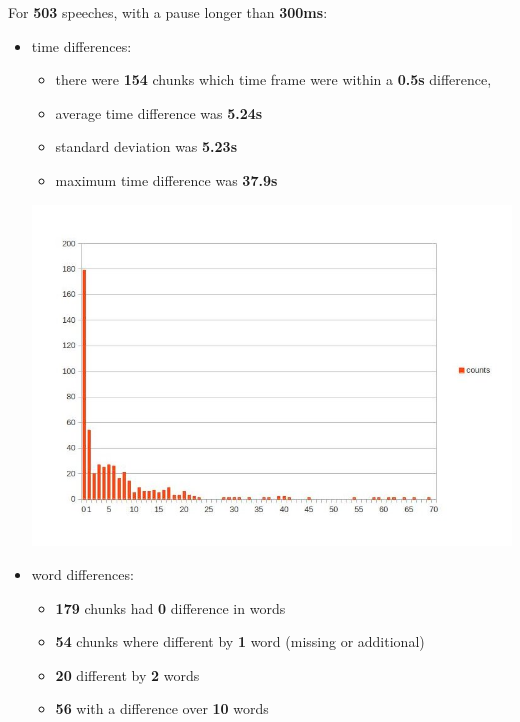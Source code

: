 \documentclass[12pt,a4paper,english]{article}
\begin{document}
\newpage
For \textbf{503} speeches, with a pause longer than \textbf{300ms}:
\begin{itemize}
    \item time differences: \newline
    \begin{itemize}
        \item there were \textbf{154} chunks which time frame were within a \textbf{0.5s} difference, 
        \item average time difference was \textbf{5.24s}
        \item standard deviation was \textbf{5.23s}
        \item maximum time difference was \textbf{37.9s}
    \end{itemize}
    \begin{center}
        \includegraphics[scale=0.6]{length_based_results_worse.jpg}
    \end {center}
    \item word differences:
    \begin{itemize}
        \item \textbf{179} chunks had \textbf{0} difference in words
        \item \textbf{54} chunks where different by \textbf{1} word (missing or additional)
        \item \textbf{20} different by \textbf{2} words
        \item \textbf{56} with a difference over \textbf{10} words
    \end{itemize}
\end{itemize}

\newpage
\end{document}

